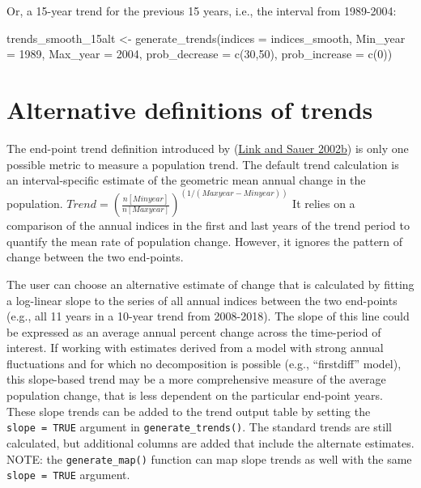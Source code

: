 \documentclass[
]{book}
\newenvironment{Shaded}{\begin{snugshade}}{\end{snugshade}}
\newcommand{\AttributeTok}[1]{\textcolor[rgb]{0.77,0.63,0.00}{#1}}
\newcommand{\DecValTok}[1]{\textcolor[rgb]{0.00,0.00,0.81}{#1}}
\newcommand{\FunctionTok}[1]{\textcolor[rgb]{0.00,0.00,0.00}{#1}}
\newcommand{\NormalTok}[1]{#1}
\newcommand{\OtherTok}[1]{\textcolor[rgb]{0.56,0.35,0.01}{#1}}
\begin{document}
Or, a 15-year trend for the previous 15 years, i.e., the interval from 1989-2004:

\begin{Shaded}
\begin{Highlighting}[]
\NormalTok{trends\_smooth\_15alt }\OtherTok{\textless{}{-}} \FunctionTok{generate\_trends}\NormalTok{(}\AttributeTok{indices =}\NormalTok{ indices\_smooth,}
                          \AttributeTok{Min\_year =} \DecValTok{1989}\NormalTok{,}
                          \AttributeTok{Max\_year =} \DecValTok{2004}\NormalTok{,}
                          \AttributeTok{prob\_decrease =} \FunctionTok{c}\NormalTok{(}\DecValTok{30}\NormalTok{,}\DecValTok{50}\NormalTok{),}
                          \AttributeTok{prob\_increase =} \FunctionTok{c}\NormalTok{(}\DecValTok{0}\NormalTok{))}
\end{Highlighting}
\end{Shaded}

\hypertarget{alternative-definitions-of-trends}{%
\section{Alternative definitions of trends}\label{alternative-definitions-of-trends}}

The end-point trend definition introduced by (\protect\hyperlink{ref-link2002a}{Link and Sauer 2002b}) is only one possible metric to measure a population trend. The default trend calculation is an interval-specific estimate of the geometric mean annual change in the population. \(Trend = (\frac {n[Minyear]}{n[Maxyear]})^{(1/(Maxyear-Minyear))}\) It relies on a comparison of the annual indices in the first and last years of the trend period to quantify the mean rate of population change. However, it ignores the pattern of change between the two end-points.

The user can choose an alternative estimate of change that is calculated by fitting a log-linear slope to the series of all annual indices between the two end-points (e.g., all 11 years in a 10-year trend from 2008-2018). The slope of this line could be expressed as an average annual percent change across the time-period of interest. If working with estimates derived from a model with strong annual fluctuations and for which no decomposition is possible (e.g., ``firstdiff'' model), this slope-based trend may be a more comprehensive measure of the average population change, that is less dependent on the particular end-point years. These slope trends can be added to the trend output table by setting the \texttt{slope\ =\ TRUE} argument in \texttt{generate\_trends()}. The standard trends are still calculated, but additional columns are added that include the alternate estimates. NOTE: the \texttt{generate\_map()} function can map slope trends as well with the same \texttt{slope\ =\ TRUE} argument.
\end{document}
